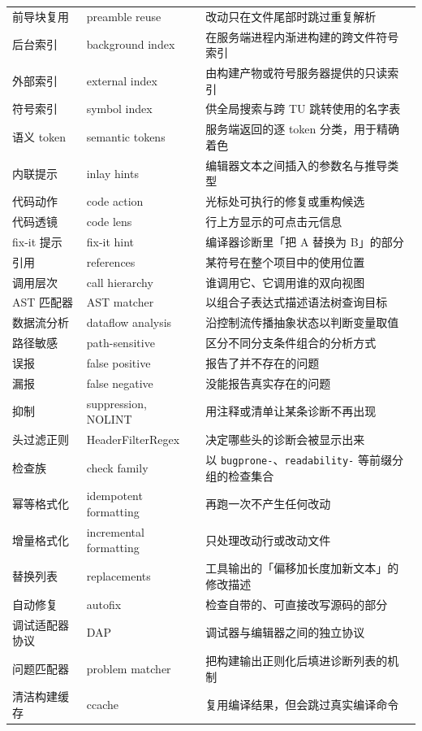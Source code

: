 \documentclass[12pt,a4paper,fontset=fandol]{ctexbook}
\begin{document}
{\begin{longtable}{@{}>{\raggedright\arraybackslash}p{}
                  >{\raggedright\arraybackslash}p{}
                  >{\raggedright\arraybackslash}p{}@{}}
前导块复用 & preamble reuse & 改动只在文件尾部时跳过重复解析 \\
后台索引 & background index & 在服务端进程内渐进构建的跨文件符号索引 \\
外部索引 & external index & 由构建产物或符号服务器提供的只读索引 \\
符号索引 & symbol index & 供全局搜索与跨 TU 跳转使用的名字表 \\
语义 token & semantic tokens & 服务端返回的逐 token 分类，用于精确着色 \\
内联提示 & inlay hints & 编辑器文本之间插入的参数名与推导类型 \\
代码动作 & code action & 光标处可执行的修复或重构候选 \\
代码透镜 & code lens & 行上方显示的可点击元信息 \\
fix-it 提示 & fix-it hint & 编译器诊断里「把 A 替换为 B」的部分 \\
引用 & references & 某符号在整个项目中的使用位置 \\
调用层次 & call hierarchy & 谁调用它、它调用谁的双向视图 \\
AST 匹配器 & AST matcher & 以组合子表达式描述语法树查询目标 \\
数据流分析 & dataflow analysis & 沿控制流传播抽象状态以判断变量取值 \\
路径敏感 & path-sensitive & 区分不同分支条件组合的分析方式 \\
误报 & false positive & 报告了并不存在的问题 \\
漏报 & false negative & 没能报告真实存在的问题 \\
抑制 & suppression, NOLINT & 用注释或清单让某条诊断不再出现 \\
头过滤正则 & HeaderFilterRegex & 决定哪些头的诊断会被显示出来 \\
检查族 & check family & 以 \texttt{bugprone-}、\texttt{readability-} 等前缀分组的检查集合 \\
幂等格式化 & idempotent formatting & 再跑一次不产生任何改动 \\
增量格式化 & incremental formatting & 只处理改动行或改动文件 \\
替换列表 & replacements & 工具输出的「偏移加长度加新文本」的修改描述 \\
自动修复 & autofix & 检查自带的、可直接改写源码的部分 \\
调试适配器协议 & DAP & 调试器与编辑器之间的独立协议 \\
问题匹配器 & problem matcher & 把构建输出正则化后填进诊断列表的机制 \\
清洁构建缓存 & ccache & 复用编译结果，但会跳过真实编译命令 \\

\end{longtable}}
\end{document}
